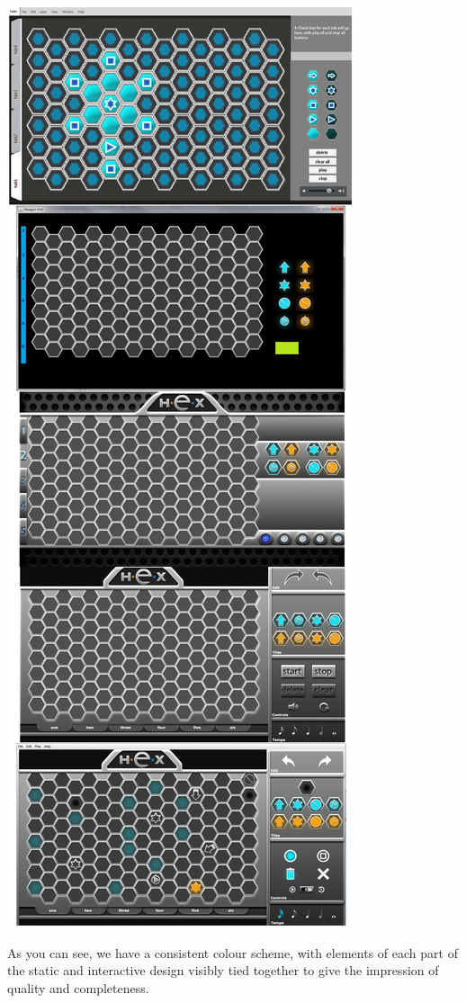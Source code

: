 \documentclass[10pt,a4paper]{article}
\begin{document}
\begin{center}
\includegraphics[scale=0.26]{controlprogression.png}
\end{center}
As you can see, we have a consistent colour scheme, with elements of each part of the static and interactive design visibly tied together to give the impression of quality and completeness.\\
\end{document}
